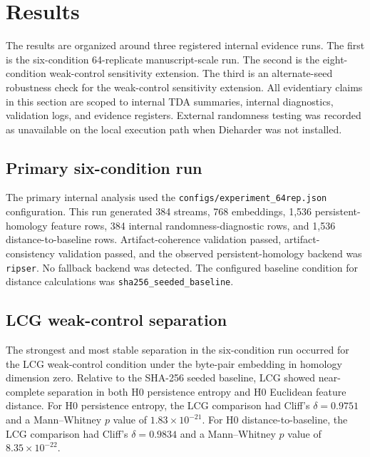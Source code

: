 
\section{Results}
\label{sec:results}

The results are organized around three registered internal evidence runs. The first is the six-condition 64-replicate manuscript-scale run. The second is the eight-condition weak-control sensitivity extension. The third is an alternate-seed robustness check for the weak-control sensitivity extension. All evidentiary claims in this section are scoped to internal TDA summaries, internal diagnostics, validation logs, and evidence registers. External randomness testing was recorded as unavailable on the local execution path when Dieharder was not installed.

\subsection{Primary six-condition run}
\label{subsec:primary-six-condition-results}

The primary internal analysis used the \texttt{configs/experiment\_64rep.json} configuration. This run generated 384 streams, 768 embeddings, 1,536 persistent-homology feature rows, 384 internal randomness-diagnostic rows, and 1,536 distance-to-baseline rows. Artifact-coherence validation passed, artifact-consistency validation passed, and the observed persistent-homology backend was \texttt{ripser}. No fallback backend was detected. The configured baseline condition for distance calculations was \texttt{sha256\_seeded\_baseline}.

\subsection{LCG weak-control separation}
\label{subsec:lcg-results}

The strongest and most stable separation in the six-condition run occurred for the LCG weak-control condition under the byte-pair embedding in homology dimension zero. Relative to the SHA-256 seeded baseline, LCG showed near-complete separation in both H0 persistence entropy and H0 Euclidean feature distance. For H0 persistence entropy, the LCG comparison had Cliff's $\delta = 0.9751$ and a Mann--Whitney $p$ value of $1.83 \times 10^{-21}$. For H0 distance-to-baseline, the LCG comparison had Cliff's $\delta = 0.9834$ and a Mann--Whitney $p$ value of $8.35 \times 10^{-22}$.

